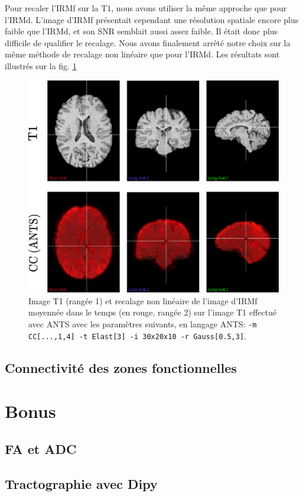 \documentclass[a4paper]{article}
\begin{document}
Pour recaler l'IRMf sur la T1, nous avons utiliser la même approche que pour l'IRMd. L'image d'IRMf présentait cependant une résolution spatiale encore plus faible que l'IRMd, et son SNR semblait aussi assez faible. Il était donc plus difficile de qualifier le recalage. Nous avons finalement arrêté notre choix sur la même méthode de recalage non linéaire que pour l'IRMd. Les résultats sont illustrés sur la fig. \ref{fmri-to-t1}

\begin{figure}
\begin{center}
\includegraphics[scale=0.5]{fmri-to-t1}
\caption{Image T1 (rangée 1) et recalage non linéaire de l'image d'IRMf moyennée dans le temps (en rouge, rangée 2) sur l'image T1 effectué avec ANTS avec les paramètres suivants, en langage ANTS: \lstinline{-m CC[...,1,4] -t Elast[3] -i 30x20x10 -r Gauss[0.5,3]}. \label{fmri-to-t1}}
\end{center}
\end{figure}  

\subsection{Connectivité des zones fonctionnelles}

\section{Bonus}

\subsection{FA et ADC}

\subsection{Tractographie avec Dipy}
\end{document}
